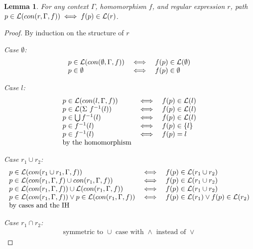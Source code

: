 \documentclass[twocolumn, openany]{sig-alternate-10pt}
\newtheorem{lem}[thm]{Lemma}
\begin{document}
\vspace{1em}
\begin{lem}
  For any context $\Gamma$, homomorphism $f$, and regular expression $r$, 
  path $p \in \mathcal{L}(con(r,\Gamma,f)) \iff f(p) \in \mathcal{L}(r)$.
\end{lem}
\begin{proof}
By induction on the structure of $r$

\emph{Case $\emptyset$:}
  \[ \begin{array}{lll}
    p \in \mathcal{L}(con(\emptyset,\Gamma,f)) &\iff& f(p) \in \mathcal{L}(\emptyset) \\
    p \in \emptyset &\iff& f(p) \in \emptyset \\
  \end{array} \]

\emph{Case $l$:}
  \[ \begin{array}{lll}
    p \in \mathcal{L}(con(l,\Gamma,f)) &\iff& f(p) \in \mathcal{L}(l) \\
    p \in \mathcal{L}(\Sigma ~ f^{-1}(l)) &\iff& f(p) \in \mathcal{L}(l) \\
    p \in \bigcup f^{-1}(l) &\iff& f(p) \in \mathcal{L}(l) \\
    p \in f^{-1}(l) &\iff& f(p) \in \{ l \} \\
    p \in f^{-1}(l) &\iff& f(p) = l \\
    \text{by the homomorphism} & & \\
  \end{array} \]

\emph{Case $r_1 \cup r_2$:}
  \[ \begin{array}{lll}
    p \in \mathcal{L}(con(r_1 \cup r_1,\Gamma,f)) &\iff& f(p) \in \mathcal{L}(r_1 \cup r_2) \\
    p \in \mathcal{L}(con(r_1,\Gamma,f) \cup con(r_1,\Gamma,f)) &\iff& f(p) \in \mathcal{L}(r_1 \cup r_2) \\
    p \in \mathcal{L}(con(r_1,\Gamma,f)) \cup \mathcal{L}(con(r_1,\Gamma,f)) &\iff& f(p) \in \mathcal{L}(r_1 \cup r_2) \\
    p \in \mathcal{L}(con(r_1,\Gamma,f)) \vee p \in \mathcal{L}(con(r_1,\Gamma,f)) 
       &\iff& 
       f(p) \in \mathcal{L}(r_1) \vee f(p) \in \mathcal{L}(r_2) \\
    \text{by cases and the IH} & & \\
  \end{array} \]

\emph{Case $r_1 \cap r_2$:} 
  \[ \begin{array}{c}
    \text{symmetric to } \cup \text{ case with } \wedge \text{ instead of } \vee
  \end{array} \]


\end{proof}
\end{document}
